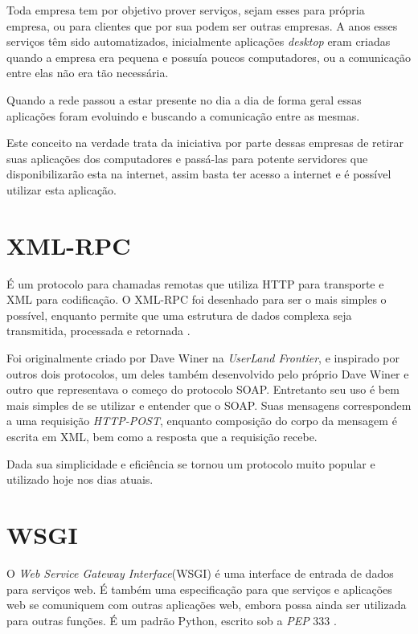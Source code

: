Toda empresa tem por objetivo prover serviços, sejam esses para própria empresa, ou para clientes que por sua podem ser outras empresas. A anos esses serviços têm sido automatizados, inicialmente aplicações \textit{desktop} eram criadas quando a empresa era pequena e possuía poucos computadores, ou a comunicação entre elas não era tão necessária.

Quando a rede passou a estar presente no dia a dia de forma geral essas aplicações foram evoluindo e buscando a comunicação entre as mesmas.

Este conceito na verdade trata da iniciativa por parte dessas empresas de retirar suas aplicações dos computadores e passá-las para potente servidores que disponibilizarão esta na internet, assim basta ter acesso a internet e é possível utilizar esta aplicação.


\section{XML-RPC}

É um protocolo para chamadas remotas que utiliza HTTP para transporte e XML para codificação. O XML-RPC foi desenhado para ser o mais simples o possível, enquanto permite que uma estrutura de dados complexa seja transmitida, processada e retornada \cite{XMLRPC}.

Foi originalmente criado por Dave Winer na \textit{UserLand Frontier}, e inspirado por outros dois protocolos, um deles também desenvolvido pelo próprio Dave Winer e outro que representava o começo do protocolo SOAP. Entretanto seu uso é bem mais simples de se utilizar e entender que o SOAP. Suas mensagens correspondem a uma requisição \textit{HTTP-POST}, enquanto composição do corpo da mensagem é escrita em XML, bem como a resposta que a requisição recebe.

Dada sua simplicidade e eficiência se tornou um protocolo muito popular e utilizado hoje nos dias atuais.


\section{WSGI}

O \textit{Web Service Gateway Interface}(WSGI) é uma interface de entrada de dados para serviços web. É também uma especificação para que serviços e aplicações web se comuniquem com outras aplicações web, embora possa ainda ser utilizada para outras funções. É um padrão Python, escrito sob a \textit{PEP} 333 \cite{WSGI}.

